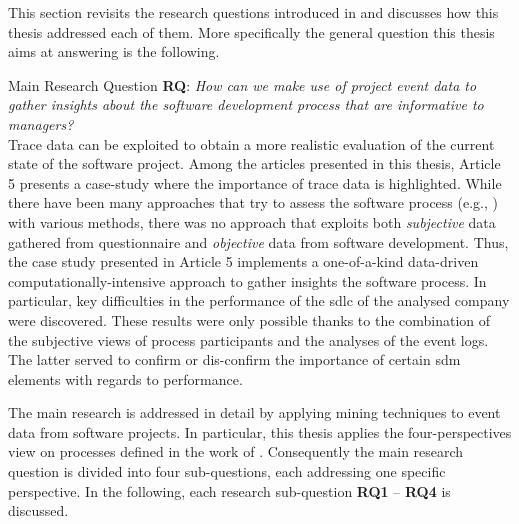 This section revisits the research questions introduced in  and discusses how this thesis addressed each of them. More specifically the general question this thesis aims at answering is the following.
\begin{question}{Main Research Question}
	\textbf{RQ}: \emph{How can we make use of project event data to gather insights about the software development process that are informative to managers?}\\
	 
	Trace data can be exploited to obtain a more realistic evaluation of the current state of the software project. Among the articles presented in this thesis, Article 5 presents a case-study where the importance of trace data is highlighted. While there have been many approaches that try to assess the software process (e.g., \citep{DBLP:journals/bise/VavpoticRH20,hovelja2015exploring,atkinson1999project}) with various methods, there was no approach that exploits both \emph{subjective} data gathered from questionnaire and \emph{objective} data from software development. Thus, the case study presented in Article 5 implements a one-of-a-kind data-driven computationally-intensive approach \citep{DBLP:journals/isr/BerenteSS19} to gather insights the software process. 
	In particular, key difficulties in the performance of the \gls{sdlc} of the analysed company were discovered. These results were only possible thanks to the combination of the subjective views of process participants and the analyses of the event logs. The latter served to confirm or dis-confirm the importance of certain \gls{sdm} elements with regards to performance.
	
\end{question}

The main research is addressed in detail by applying mining techniques to event data from software projects. In particular, this thesis applies the four-perspectives view on processes defined in the work of \cite{DBLP:books/sp/Aalst16}. Consequently the main research question is divided into four sub-questions, each addressing one specific perspective.  In the following, each research sub-question \textbf{RQ1} – \textbf{RQ4} is discussed.\\


